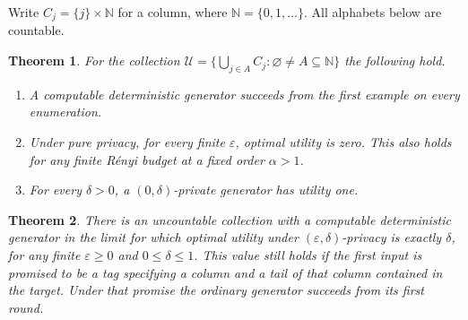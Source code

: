 \documentclass[11pt]{article}
\newtheorem{theorem}{Theorem}
\newcommand{\N}{\mathbb N}
\begin{document}
Write $C_j=\{j\}\times\N$ for a column, where $\N=\{0,1,\ldots\}$. All alphabets below are countable.
\begin{theorem}\label{columns}
For the collection $\mathcal U=\{\bigcup_{j\in A} C_j:\varnothing\ne A\subseteq\N\}$ the following hold.
\begin{enumerate}
\item A computable deterministic generator succeeds from the first example on every enumeration.
\item Under pure privacy, for every finite $\varepsilon$, optimal utility is zero. This also holds for any finite R\'enyi budget at a fixed order $\alpha>1$.
\item For every $\delta>0$, a $(0,\delta)$-private generator has utility one.
\end{enumerate}
\end{theorem}
\begin{theorem}\label{tag}
There is an uncountable collection with a computable deterministic generator in the limit for which optimal utility under $(\varepsilon,\delta)$-privacy is exactly $\delta$, for any finite $\varepsilon\ge0$ and $0\le\delta\le1$. This value still holds if the first input is promised to be a tag specifying a column and a tail of that column contained in the target. Under that promise the ordinary generator succeeds from its first round.
\end{theorem}
\end{document}
